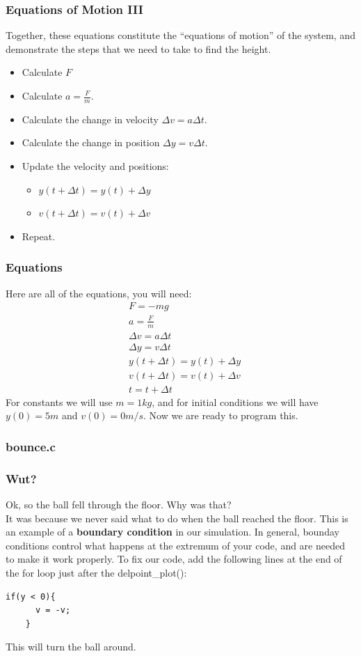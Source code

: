 \documentclass{beamer}
\begin{document}
\begin{frame}
  \frametitle{Equations of Motion III}
  Together, these equations constitute the ``equations of motion'' of the
  system, and demonstrate the steps that we need to take to find the height.
  \begin{itemize}
    \item Calculate $F$
    \item Calculate $a = \frac{F}{m}$.
    \item Calculate the change in velocity $\Delta v = a\Delta t$.
    \item Calculate the change in position $\Delta y = v\Delta t$.
    \item Update the velocity and positions:
      \begin{itemize}
      \item $y(t+\Delta t) = y(t) + \Delta y$
      \item $v(t+\Delta t) = v(t) + \Delta v$
      \end{itemize}
    \item Repeat.
  \end{itemize}
\end{frame}

\begin{frame}
  \frametitle{Equations}
  Here are all of the equations, you will need:
  \begin{eqnarray*}
    &F = -mg  \\
    &a = \frac{F}{m}\\
    &\Delta v = a\Delta t  \\
    &\Delta y = v\Delta t\\
    &y(t+\Delta t) = y(t) + \Delta y \\
    &v(t+\Delta t) = v(t) + \Delta v\\
    &t = t + \Delta t
  \end{eqnarray*}
  For constants we will use $m = 1kg$, and for initial
  conditions we will have $y(0) = 5 m$ and $v(0)=0m/s$.
  Now we are ready to program this.
\end{frame}

\begin{frame}
  \frametitle{bounce.c}
  
\end{frame}

\begin{frame}[fragile]
  \frametitle{Wut?}
  Ok, so the ball fell through the floor. Why was that?\\
  It was because we never said what to do when the ball reached
  the floor. This is an example of a \textbf{boundary condition} in
  our simulation. In general, bounday conditions control what happens
  at the extremum of your code, and are needed to make it work properly.
  To fix our code, add the following lines at the end of the for loop
  just after the delpoint\_plot():
  \begin{lstlisting}[style=customc]
    if(y < 0){
      v = -v;
    }
  \end{lstlisting}
  This will turn the ball around.
\end{frame}
\end{document}
